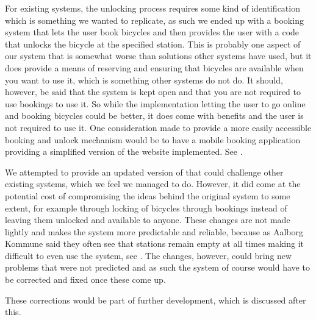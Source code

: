 For existing systems, the unlocking process requires some kind of identification which is something we wanted to replicate, as such we ended up with a booking system that lets the user book bicycles and then provides the user with a code that unlocks the bicycle at the specified station.
This is probably one aspect of our system that is somewhat worse than solutions other systems have used, but it does provide a means of reserving and ensuring that bicycles are available when you want to use it, which is something other systems do not do. 
It should, however, be said that the system is kept open and that you are not required to use bookings to use it.
So while the implementation letting the user to go online and booking bicycles could be better, it does come with benefits and the user is not required to use it.
One consideration made to provide a more easily accessible booking and unlock mechanism would be to have a mobile booking application providing a simplified version of the website implemented. See .

We attempted to provide an updated version of \bycykel that could challenge other existing systems, which we feel we managed to do. 
However, it did come at the potential cost of compromising the ideas behind the original system to some extent, for example through locking of bicycles through bookings instead of leaving them unlocked and available to anyone. 
These changes are not made lightly and makes the system more predictable and reliable, because as Aalborg Kommune said they often see that stations remain empty at all times making it difficult to even use the system, see . 
The changes, however, could bring new problems that were not predicted and as such the system of course would have to be corrected and fixed once these come up.

These corrections would be part of further development, which is discussed after this.
